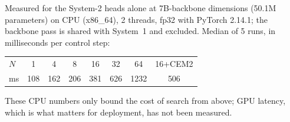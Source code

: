 Measured for the System-2 heads alone at 7B-backbone dimensions (50.1M parameters) on CPU (x86\_64), 2 threads, fp32 with PyTorch 2.14.1; the backbone pass is shared with System~1 and excluded. Median of 5 runs, in milliseconds per control step:
\begin{center}\small
\begin{tabular}{lccccccc}
\toprule
$N$ & 1 & 4 & 8 & 16 & 32 & 64 & 16+CEM2 \\
ms & 108 & 162 & 206 & 381 & 626 & 1232 & 506 \\
\bottomrule
\end{tabular}
\end{center}
These CPU numbers only bound the cost of search from above; GPU latency, which is what matters for deployment, has not been measured.
